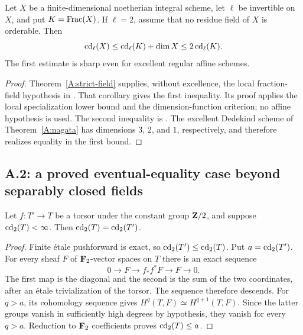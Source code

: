 
\begin{corollary}
\label{A:generic-plus-dimension}
Let $X$ be a finite-dimensional noetherian integral scheme, let $\ell$ be invertible on $X$, and put $K=\operatorname{Frac}(X)$. If $\ell=2$, assume that no residue field of $X$ is orderable. Then
\[
 \operatorname{cd}_\ell(X)\leq\operatorname{cd}_\ell(K)+\dim X\leq2\operatorname{cd}_\ell(K).
\]
The first estimate is sharp even for excellent regular affine schemes.
\end{corollary}
\begin{proof}
Theorem~\ref{A:strict-field} supplies, without excellence, the local fraction-field hypothesis in \citet[Exposé X, Corollaire 4.4]{A_SGA4}. That corollary gives the first inequality. Its proof applies the local specialization lower bound and the dimension-function criterion; no affine hypothesis is used. The second inequality is \citet[Exposé X, Corollaire 2.5]{A_SGA4}. The excellent Dedekind scheme of Theorem~\ref{A:nagata} has dimensions $3$, $2$, and $1$, respectively, and therefore realizes equality in the first bound.
\end{proof}

\subsection{A.2: a proved eventual-equality case beyond separably closed fields}

\begin{lemma}
\label{A:quadratic-descent}
Let $f:T'\to T$ be a torsor under the constant group $\mathbf Z/2$, and suppose $\operatorname{cd}_2(T)<\infty$. Then $\operatorname{cd}_2(T)=\operatorname{cd}_2(T')$.
\end{lemma}
\begin{proof}
Finite étale pushforward is exact, so $\operatorname{cd}_2(T')\leq\operatorname{cd}_2(T)$. Put $a=\operatorname{cd}_2(T')$. For every sheaf $F$ of $\mathbf F_2$-vector spaces on $T$ there is an exact sequence
\[
 0\longrightarrow F\longrightarrow f_*f^*F
   \longrightarrow F\longrightarrow0.
\]
The first map is the diagonal and the second is the sum of the two coordinates, after an étale trivialization of the torsor. The sequence therefore descends. For $q>a$, its cohomology sequence gives
$H^q(T,F)\simeq H^{q+1}(T,F)$. Since the latter groups vanish in sufficiently high degrees by hypothesis, they vanish for every $q>a$. Reduction to $\mathbf F_2$ coefficients proves $\operatorname{cd}_2(T)\leq a$.
\end{proof}

